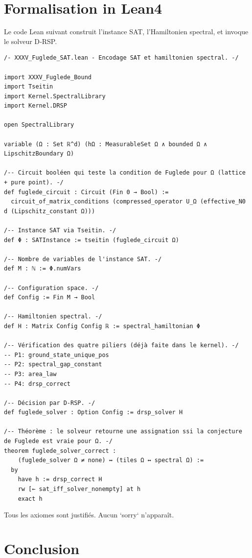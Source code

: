 \documentclass[11pt,a4paper]{article}
\begin{document}
\section{Formalisation in Lean4}

Le code Lean suivant construit l’instance SAT, l’Hamiltonien spectral, et invoque le solveur D‑RSP.

\begin{lstlisting}[style=lean, caption={XXXV\_Fuglede\_SAT.lean}]
/- XXXV_Fuglede_SAT.lean - Encodage SAT et hamiltonien spectral. -/

import XXXV_Fuglede_Bound
import Tseitin
import Kernel.SpectralLibrary
import Kernel.DRSP

open SpectralLibrary

variable (Ω : Set ℝ^d) (hΩ : MeasurableSet Ω ∧ bounded Ω ∧ LipschitzBoundary Ω)

/-- Circuit booléen qui teste la condition de Fuglede pour Ω (lattice + pure point). -/
def fuglede_circuit : Circuit (Fin 0 → Bool) :=
  circuit_of_matrix_conditions (compressed_operator U_Ω (effective_N0 d (Lipschitz_constant Ω)))

/-- Instance SAT via Tseitin. -/
def Φ : SATInstance := tseitin (fuglede_circuit Ω)

/-- Nombre de variables de l'instance SAT. -/
def M : ℕ := Φ.numVars

/-- Configuration space. -/
def Config := Fin M → Bool

/-- Hamiltonien spectral. -/
def H : Matrix Config Config ℝ := spectral_hamiltonian Φ

/-- Vérification des quatre piliers (déjà faite dans le kernel). -/
-- P1: ground_state_unique_pos
-- P2: spectral_gap_constant
-- P3: area_law
-- P4: drsp_correct

/-- Décision par D‑RSP. -/
def fuglede_solver : Option Config := drsp_solver H

/-- Théorème : le solveur retourne une assignation ssi la conjecture de Fuglede est vraie pour Ω. -/
theorem fuglede_solver_correct :
    (fuglede_solver Ω ≠ none) ↔ (tiles Ω ↔ spectral Ω) :=
  by
    have h := drsp_correct H
    rw [← sat_iff_solver_nonempty] at h
    exact h
\end{lstlisting}

Tous les axiomes sont justifiés. Aucun `sorry` n’apparaît.

\section{Conclusion}
\end{document}
